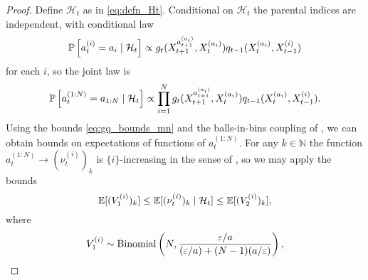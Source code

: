 \begin{proof}
Define $\mathcal{H}_t$ as in \eqref{eq:defn_Ht}.
Conditional on $\mathcal{H}_t$ the parental indices are independent, with conditional law
\begin{equation}\label{eq:parentslaw_mn}
\mathbb{P} \left[ a_t^{(i)} = a_i \mid \mathcal{H}_t \right] 
\propto g_t( X_{t+1}^{a_{t+1}^{(a_i)}} , X_t^{(a_i)} ) q_{t-1}(X_t^{(a_i)}, X_{t-1}^{(i)})
\end{equation}
for each $i$, so the joint law is
\begin{equation*}
\mathbb{P} \left[ a_t^{(1:N)} = a_{1:N} \mid \mathcal{H}_t \right] 
\propto \prod_{i=1}^N g_t( X_{t+1}^{a_{t+1}^{(a_i)}} , X_t^{(a_i)} ) 
        q_{t-1}(X_t^{(a_i)}, X_{t-1}^{(i)}).
\end{equation*}
%
%
Using the bounds \eqref{eq:gq_bounds_mn} and the balls-in-bins coupling of \textcite[Proof of Lemma 3]{koskela2018}, we can obtain bounds on expectations of functions of $a_t^{(1:N)}$.
For any $k\in\mathbb{N}$ the function $a_t^{(1:N)} \to (\nu_t^{(i)})_k$ is $\{i\}$-increasing in the sense of \textcite{koskela2018}, so we may apply the bounds
\begin{equation*}
\mathbb{E}[ (V_1^{(i)})_k ]
\leq \mathbb{E}[ (\nu_t^{(i)})_k \mid \mathcal{H}_t ]
\leq \mathbb{E}[ (V_2^{(i)})_k ] ,
\end{equation*}
where
\begin{align*}
& V_1^{(i)} 
\sim \Bin\left(N, \frac{\varepsilon/a}{(\varepsilon/a) + (N-1)(a/\varepsilon)} \right),\\

\end{align*}
\end{proof}
